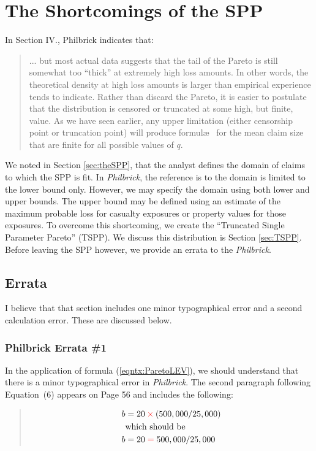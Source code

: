 \documentclass[]{article} %
\newcommand{\philbrick}{\textit{Philbrick}}
\begin{document}
\section{The Shortcomings of the SPP}

In Section IV., Philbrick indicates that:
\begin{quote}
	... but most actual data suggests that the tail of the Pareto is still somewhat too “thick” at extremely high loss amounts. In other words, the theoretical density at high loss amounts is larger than empirical experience tends to indicate. Rather than discard the Pareto, it is easier to postulate that the distribution is censored or truncated at some high, but finite, value. As we have seen earlier, any upper limitation (either censorship point or truncation point) will produce formul\ae~ for the mean claim size that are finite for all possible
	values of $q$. 
\end{quote}

We noted in Section \ref{sec:theSPP}, that the analyst defines the domain of claims to which the SPP is fit. In \philbrick, the reference is to the domain is limited to the lower bound only. However, we may specify the domain using both lower and upper bounds. The upper bound may be defined using an estimate of the maximum probable loss for casualty exposures or property values for those exposures. To overcome this shortcoming, we create the ``Truncated Single Parameter Pareto'' (TSPP). We discuss this distribution is Section \ref{sec:TSPP}. Before leaving the SPP however, we provide an errata to the \philbrick.

\subsection{Errata}
I believe that that section includes one minor typographical error and a second calculation error. These are discussed below.

\subsubsection{Philbrick Errata \#1}
	In the application of formula (\ref{eqntx:ParetoLEV}), we should understand that there is a minor typographical error in \philbrick. The second paragraph following Equation~(6) appears on Page 56 and includes the following:
	\begin{quote}
		\begin{align}
		b &= 20 \color{red}\times\color{black} (500,000/25,000)\nonumber\\
		&\text{which should be}\nonumber\\
		b &= 20 \color{red} = \color{black} 500,000/25,000\nonumber
		\end{align}
	\end{quote}
\end{document}
